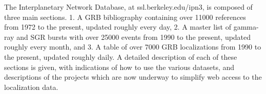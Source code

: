 


\bigskip



\bigskip

\noindent The Interplanetary Network Database, at ssl.berkeley.edu/ipn3, is composed of three main sections.
1.	A GRB bibliography containing over 11000 references from 1972 to the present, updated roughly every day,
2.	A master list of gamma-ray and SGR bursts with over 25000 events from 1990 to the present, updated roughly every month, and
3.	A table of over 7000 GRB localizations from 1990 to the present, updated roughly daily.
A detailed description of each of these sections is given, with indications of how to use the various datasets, and descriptions of the projects which are now underway to simplify web access to the localization data.
